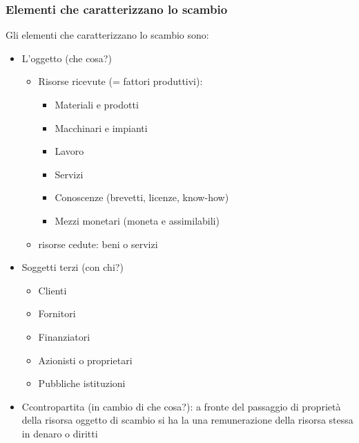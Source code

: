 \subsubsection{Elementi che caratterizzano lo scambio}
Gli elementi che caratterizzano lo scambio sono:
\begin{itemize}
	\item L’oggetto (che cosa?)
		\begin{itemize}
			\item Risorse ricevute (= fattori produttivi):
				\begin{itemize}
					\item Materiali e prodotti
					\item Macchinari e impianti
					\item Lavoro
					\item Servizi
					\item Conoscenze (brevetti, licenze, know-how)
					\item Mezzi monetari (moneta e assimilabili)
				\end{itemize}
			\item risorse cedute: beni o servizi
		\end{itemize}
	\item Soggetti terzi (con chi?)
		\begin{itemize}
			\item Clienti
			\item Fornitori
			\item Finanziatori
			\item Azionisti o proprietari
			\item Pubbliche istituzioni
		\end{itemize}
	\item Ccontropartita (in cambio di che cosa?): a fronte del passaggio di proprietà della risorsa oggetto di scambio si ha la
   una remunerazione della risorsa stessa in denaro o diritti
\end{itemize}
